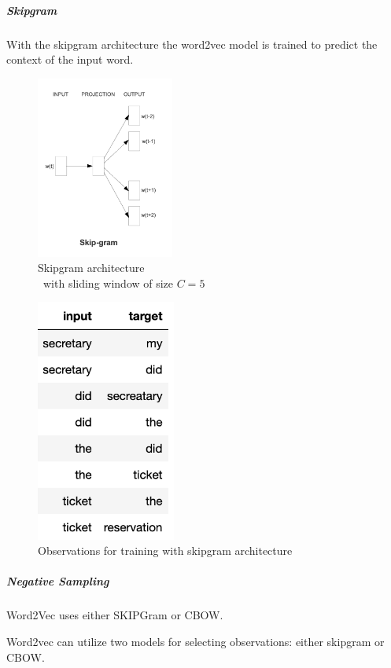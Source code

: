 		\subparagraph{Skipgram} 
		With the skipgram architecture the word2vec model is trained to predict the context of the input word.
		
		\begin{figure}[ht]
			\centering
			\includegraphics[height=6cm]{Bilder/word2vec/architecture_skipgram.png}
			\caption{Skipgram architecture\\\ with sliding window of size $C=5$ }
			\label{fig:cbow-architecture}
		\end{figure}
	
		\begin{figure}[ht]
			\centering
			\includegraphics[height=8cm]{Bilder/word2vec/skipgram.png}
			\caption{Observations for training with skipgram architecture}
			\label{fig:cbow-architecture}
		\end{figure}
		
		
		\subparagraph{Negative Sampling}
		
		
		Word2Vec uses either SKIPGram or CBOW.
		
		Word2vec can utilize two models for selecting observations: either skipgram or \ac{CBOW}. 
		
	
		
